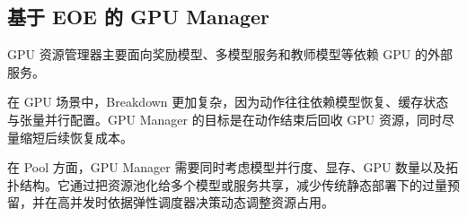 \subsection{基于 EOE 的 GPU Manager}
GPU 资源管理器主要面向奖励模型、多模型服务和教师模型等依赖 GPU 的外部服务。

在 GPU 场景中，Breakdown 更加复杂，因为动作往往依赖模型恢复、缓存状态与张量并行配置。GPU Manager 的目标是在动作结束后回收 GPU 资源，同时尽量缩短后续恢复成本。

在 Pool 方面，GPU Manager 需要同时考虑模型并行度、显存、GPU 数量以及拓扑结构。它通过把资源池化给多个模型或服务共享，减少传统静态部署下的过量预留，并在高并发时依据弹性调度器决策动态调整资源占用。
